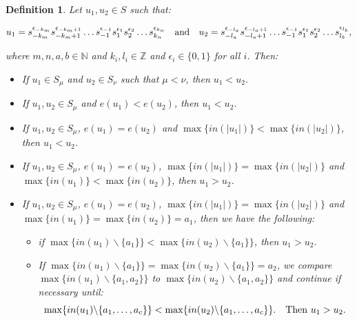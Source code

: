 \documentclass[11pt]{amsart}
\newtheorem{defn}{Definition}
\begin{document}
\begin{defn}\label{ord2}\rm
Let $u_1, u_2 \in S$ such that:

$$u_1=s_{-k_m}^{\epsilon_{-k_m}}s_{-k_{m}+1}^{\epsilon_{-k_{m}+1}} \ldots s_{-1}^{\epsilon_{-1}} s_1^{\epsilon_1}s_2^{\epsilon_2}\ldots s_{k_n}^{\epsilon_{k_{n}}}\quad {\rm and} \quad u_2=s_{-l_a}^{\epsilon_{-l_a}}s_{-l_a+1}^{\epsilon_{-l_a+1}} \ldots s_{-1}^{\epsilon_{-1}} s_1^{\epsilon_1}s_2^{\epsilon_2}\ldots s_{l_b}^{\epsilon_{l_{b}}},$$ 

\noindent where $m, n, a, b \in \mathbb{N}$ and $k_i, l_i \in \mathbb{Z}$ and $\epsilon_i \in \{0, 1\}$ for all $i$. Then:

\smallbreak

\begin{itemize}
\item[(a)] If $u_1 \in S_{\mu}$ and $u_2 \in S_{\nu}$ such that $\mu < \nu$, then $u_1<u_2$.

\vspace{.1in}

\item[(b)] If $u_1, u_2 \in S_{\mu}$ and  $e(u_1) < e(u_2)$, then $u_1 < u_2$.

\vspace{.1in}

\item[(c)] If $u_1, u_2 \in S_{\mu}$, $e(u_1) = e(u_2)$ and $\max\{in(|u_1|) \} < \max\{in(|u_2|)\}$, then $u_1<u_2$.

\vspace{.1in}

\item[(d)] If $u_1, u_2 \in S_{\mu}$, $e(u_1) = e(u_2)$, $\max\{in(|u_1|) \} = \max\{in(|u_2|)\}$ and $\max\{in(u_1) \} < \max\{ in(u_2)\}$, then $u_1>u_2$.

\vspace{.1in}

\item[(e)] If $u_1, u_2 \in S_{\mu}$, $e(u_1) = e(u_2)$, $\max\{in(|u_1|) \} = \max\{in(|u_2|)\}$ and $\max\{in(u_1) \} = \max\{ in(u_2)\}=a_1$, then we have the following:
\smallbreak
\begin{itemize}
\item[$\alpha$.] if $\max\{in(u_1)\backslash \{a_1\}\} < \max\{in(u_2)\backslash \{a_1\}\}$, then $u_1>u_2$.
\smallbreak
\item[$\beta$.] If $\max\{in(u_1)\backslash \{a_1\}\}=\max\{in(u_2)\backslash \{a_1\}\}=a_2$, we compare $\max\{in(u_1)\backslash \{a_1, a_2\}\}$ to $\max\{in(u_2)\backslash \{a_1, a_2\}\}$ and continue if necessary until:
$$\max\{in(u_1)\backslash \{a_1, \ldots, a_c\}\} < \max\{in(u_2)\backslash \{a_1, \ldots, a_c\}\}.\quad {\rm Then}\ u_1 > u_2.$$
\end{itemize}
\end{itemize}
\end{defn}
\end{document}
